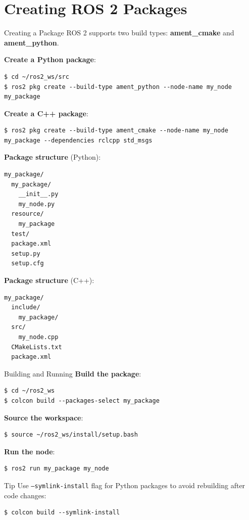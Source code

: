 \section{Creating ROS 2 Packages}

\begin{frame}{Creating a Package}
    ROS 2 supports two build types: \textbf{ament\_cmake} and \textbf{ament\_python}.

    \textbf{Create a Python package}:
    \begin{lstlisting}[language=shell]
$ cd ~/ros2_ws/src
$ ros2 pkg create --build-type ament_python --node-name my_node my_package
\end{lstlisting}

    \textbf{Create a C++ package}:
    \begin{lstlisting}[language=shell]
$ ros2 pkg create --build-type ament_cmake --node-name my_node my_package --dependencies rclcpp std_msgs
\end{lstlisting}

    \framebreak

    \textbf{Package structure} (Python):
    \begin{lstlisting}[language=syntax]
my_package/
  my_package/
    __init__.py
    my_node.py
  resource/
    my_package
  test/
  package.xml
  setup.py
  setup.cfg
\end{lstlisting}

    \framebreak

    \textbf{Package structure} (C++):
    \begin{lstlisting}[language=syntax]
my_package/
  include/
    my_package/
  src/
    my_node.cpp
  CMakeLists.txt
  package.xml
\end{lstlisting}
\end{frame}

\begin{frame}[fragile]{Building and Running}
    \textbf{Build the package}:
    \begin{lstlisting}[language=shell]
$ cd ~/ros2_ws
$ colcon build --packages-select my_package
\end{lstlisting}

    \textbf{Source the workspace}:
    \begin{lstlisting}[language=shell]
$ source ~/ros2_ws/install/setup.bash
\end{lstlisting}

    \textbf{Run the node}:
    \begin{lstlisting}[language=shell]
$ ros2 run my_package my_node
\end{lstlisting}

    \begin{alertblock}{Tip}
        Use \texttt{--symlink-install} flag for Python packages to avoid rebuilding after code changes:
        \begin{lstlisting}[language=shell]
$ colcon build --symlink-install
\end{lstlisting}
    \end{alertblock}
\end{frame}

